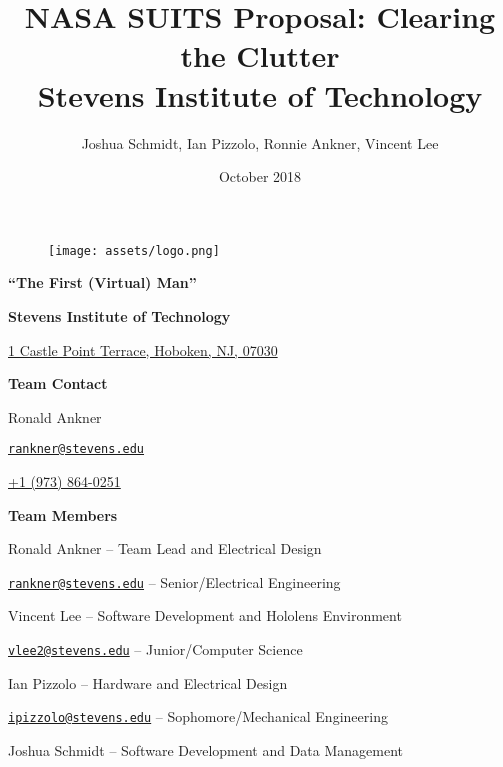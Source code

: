 \documentclass{article}
\title{%
  NASA SUITS Proposal: Clearing the Clutter \\
	\large Stevens Institute of Technology}
\date{October 2018}
\author{Joshua Schmidt, Ian Pizzolo, Ronnie Ankner, Vincent Lee}
\begin{document}
\maketitle

\bigskip
\bigskip
\bigskip
\bigskip

\begin{figure}[!htb]
  \centering
  \texttt{[image: assets/logo.png]}
  \label{fig:logo}
\end{figure}

\newpage

\tableofcontents

\newpage

\begin{center}

\textbf{“The First (Virtual) Man”}

\bigskip
\bigskip

\textbf{Stevens Institute of Technology}

\href{http://maps.google.com/?q=1+Castle+Point+Terrace,+Hoboken,+NJ,+07030}{1 Castle Point Terrace, Hoboken, NJ, 07030}

\bigskip
\bigskip

\textbf{Team Contact}

Ronald Ankner

\href{mailto:rankner@stevens.edu}{\nolinkurl{rankner@stevens.edu}}

\href{tel:19738640251}{+1 (973) 864-0251}

\bigskip
\bigskip

\textbf{Team Members}

Ronald Ankner -- Team Lead and Electrical Design

\href{mailto:rankner@stevens.edu}{\nolinkurl{rankner@stevens.edu}} -- Senior/Electrical Engineering

\bigskip
\bigskip

Vincent Lee -- Software Development and Hololens Environment

\href{mailto:vlee2@stevens.edu}{\nolinkurl{vlee2@stevens.edu}} -- Junior/Computer Science

\bigskip
\bigskip

Ian Pizzolo -- Hardware and Electrical Design

\href{mailto:ipizzolo@stevens.edu}{\nolinkurl{ipizzolo@stevens.edu}} -- Sophomore/Mechanical Engineering

\bigskip
\bigskip

Joshua Schmidt -- Software Development and Data Management


\end{center}
\end{document}
